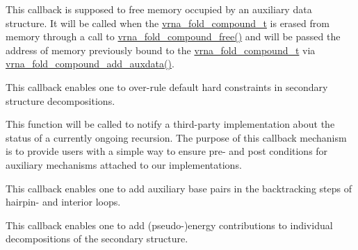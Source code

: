 \begin{DoxyRefList}
\item[\label{callbacks__callbacks000001}%
\Hypertarget{callbacks__callbacks000001}%
Global \hyperlink{group__fold__compound_ga7806651f51b195013839a218b3bbd5a3}{vrna\+\_\+callback\+\_\+free\+\_\+auxdata} (void $\ast$data)]This callback is supposed to free memory occupied by an auxiliary data structure. It will be called when the \hyperlink{group__fold__compound_ga1b0cef17fd40466cef5968eaeeff6166}{vrna\+\_\+fold\+\_\+compound\+\_\+t} is erased from memory through a call to \hyperlink{group__fold__compound_ga576a077b418a9c3650e06f8e5d296fc2}{vrna\+\_\+fold\+\_\+compound\+\_\+free()} and will be passed the address of memory previously bound to the \hyperlink{group__fold__compound_ga1b0cef17fd40466cef5968eaeeff6166}{vrna\+\_\+fold\+\_\+compound\+\_\+t} via \hyperlink{group__fold__compound_gafc44c76a1aacf61bfccb8cd698772b98}{vrna\+\_\+fold\+\_\+compound\+\_\+add\+\_\+auxdata()}.  
\item[\label{callbacks__callbacks000012}%
\Hypertarget{callbacks__callbacks000012}%
Global \hyperlink{group__hard__constraints_gae465f1d4a3d8b6592b38ecbb0d9f613d}{vrna\+\_\+callback\+\_\+hc\+\_\+evaluate} (int i, int j, int k, int l, unsigned char d, void $\ast$data)]This callback enables one to over-\/rule default hard constraints in secondary structure decompositions.  
\item[\label{callbacks__callbacks000002}%
\Hypertarget{callbacks__callbacks000002}%
Global \hyperlink{group__fold__compound_gac86036fa8cad1108832335063243cdc8}{vrna\+\_\+callback\+\_\+recursion\+\_\+status} (unsigned char status, void $\ast$data)]This function will be called to notify a third-\/party implementation about the status of a currently ongoing recursion. The purpose of this callback mechanism is to provide users with a simple way to ensure pre-\/ and post conditions for auxiliary mechanisms attached to our implementations.  
\item[\label{callbacks__callbacks000015}%
\Hypertarget{callbacks__callbacks000015}%
Global \hyperlink{group__soft__constraints_gaeb6448da6c593d4c489c7fbadcb99499}{vrna\+\_\+callback\+\_\+sc\+\_\+backtrack} (int i, int j, int k, int l, unsigned char d, void $\ast$data)]This callback enables one to add auxiliary base pairs in the backtracking steps of hairpin-\/ and interior loops.  
\item[\label{callbacks__callbacks000013}%
\Hypertarget{callbacks__callbacks000013}%
Global \hyperlink{group__soft__constraints_ga88a266695d9e25cc12114dceb7b4565e}{vrna\+\_\+callback\+\_\+sc\+\_\+energy} (int i, int j, int k, int l, unsigned char d, void $\ast$data)]This callback enables one to add (pseudo-\/)energy contributions to individual decompositions of the secondary structure.  

\end{DoxyRefList}
